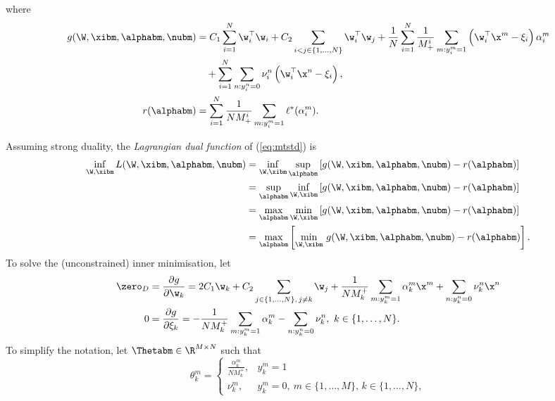 where 
\begin{equation*}
\begin{aligned}
g(\W, \xibm, \alphabm, \nubm)
&= C_1 \sum_{i=1}^{N} \w_i^\top \w_i + C_2 \sum_{i < j \in \{1,\dots,N\}} \w_i^\top \w_j
   + \frac{1}{N} \sum_{i = 1}^{N} \frac{1}{M_+^i} \sum_{m: y_i^m = 1} \left( \w_i^\top \x^m - \xi_i \right) \alpha_i^m \\
& \quad + \sum_{i=1}^{N} \sum_{n: y_i^n = 0} \nu_i^n \left( \w_i^\top \x^n - \xi_i \right), \\
r(\alphabm) &= \sum_{i = 1}^{N} \frac{1}{N M_+^i} \sum_{m: y_i^m = 1} \ell^*(\alpha_i^m).
\end{aligned}
\end{equation*}

Assuming strong duality, the \emph{Lagrangian dual function} of (\ref{eq:mtstd}) is
\begin{equation*}
\begin{aligned}
\inf_{\W, \xibm} L(\W, \xibm, \alphabm, \nubm)
&= \inf_{\W, \xibm} \sup_\alphabm \left[ g(\W, \xibm, \alphabm, \nubm) - r(\alphabm) \right] \\
&= \sup_\alphabm \inf_{\W, \xibm} \left[ g(\W, \xibm, \alphabm, \nubm) - r(\alphabm) \right] \\
&= \max_\alphabm \min_{\W, \xibm} \left[ g(\W, \xibm, \alphabm, \nubm) - r(\alphabm) \right] \\
&= \max_\alphabm \left[ \min_{\W, \xibm} \, g(\W, \xibm, \alphabm, \nubm) - r(\alphabm) \right].
\end{aligned}
\end{equation*}
To solve the (unconstrained) inner minimisation, let
\begin{equation*}
\begin{aligned}
\zero_D &= \frac{\partial g}{\partial \w_k} 
   = 2C_1 \w_k + C_2 \sum_{j \in \{1,\dots,N\}, \, j \ne k} \w_j 
     + \frac{1}{N M_k^+} \sum_{m: y_k^m = 1} \alpha_k^m \x^m
     + \sum_{n: y_k^n = 0} \nu_k^n \x^n \\
0 &= \frac{\partial g}{\partial \xi_k} 
   = -\frac{1}{N M_k^+} \sum_{m: y_k^m = 1} \alpha_k^m - \sum_{n: y_k^n = 0} \nu_k^n,
   \ k \in \{1,\dots,N\}.
\end{aligned}
\end{equation*}
To simplify the notation, let $\Thetabm \in \R^{M \times N}$ such that
\begin{equation*}
\theta_k^m = \begin{cases}
\frac{\alpha_k^m}{N M_k^+}, & y_k^m = 1 \\
\nu_k^m, & y_k^m = 0, \ m \in \{1,\dots,M\}, \, k \in \{1,\dots,N\},
\end{cases}
\end{equation*}
